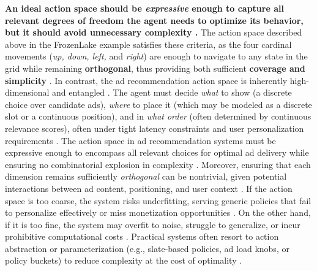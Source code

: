 \documentclass[final]{anthology-ch}         %
\begin{document}
\textbf{An ideal action space should be \textit{expressive} enough to capture all relevant degrees of freedom the agent needs to optimize its behavior, but it should avoid unnecessary complexity \cite{zhu2024discretizing, liu2025reducing}.} The action space described above in the FrozenLake example satisfies these criteria, as the four cardinal movements (\textit{up, down, left,} and \textit{right}) are enough to navigate to any state in the grid while remaining \textbf{orthogonal}, thus providing both sufficient \textbf{coverage and simplicity} \cite{frozenlake}.  In contrast, the ad recommendation action space is inherently high-dimensional and entangled \cite{ie2019recsim}. The agent must decide \emph{what} to show (a discrete choice over candidate ads), \emph{where} to place it  (which may be modeled as a discrete slot or a continuous position), and in \emph{what order} (often determined by continuous relevance scores), often under tight latency constraints and user personalization requirements \cite{zhao2020jointly}. The action space in ad recommendation systems must be expressive enough to encompass all relevant choices for optimal ad delivery while ensuring no combinatorial explosion in complexity \cite{ie2019slateq}. Moreover, ensuring that each dimension remains sufficiently \emph{orthogonal} can be nontrivial, given potential interactions between ad content, positioning, and user context \cite{ie2019reinforcement}. If the action space is too coarse, the system risks underfitting, serving generic policies that fail to personalize effectively or miss monetization opportunities \cite{ie2019slateq}. On the other hand, if it is too fine, the system may overfit to noise, struggle to generalize, or incur prohibitive computational costs \cite{ie2019slateq}. Practical systems often resort to action abstraction or parameterization (e.g., slate-based policies, ad load knobs, or policy buckets) to reduce complexity at the cost of optimality \cite{ie2019reinforcement, hohnhold2015focusing, sagtani2024ad}.
\end{document}
